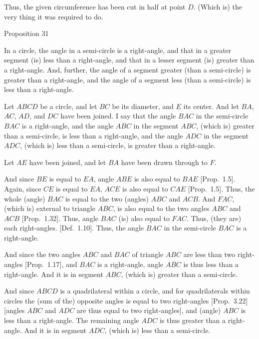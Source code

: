 Thus, the given circumference has been cut in half at point $D$. (Which is)
the very thing it was required to do. 


\begin{center}
{\large Proposition 31}
\end{center}

In a circle, the angle in a semi-circle is a right-angle, and that in a
greater segment (is) less than a right-angle, and that in a
lesser segment (is) greater than a right-angle. And, further, the angle of
a segment greater (than a semi-circle) is greater than a right-angle, and
the angle of a segment less (than a semi-circle) is less than a right-angle.

\epsfysize=2.2in
\centerline{}

Let $ABCD$  be a circle, and let $BC$ be its diameter, and $E$ its center. And let $BA$, $AC$, $AD$, and $DC$ have been joined. I say that the angle $BAC$ in the semi-circle $BAC$ is a right-angle, and the angle $ABC$ in the segment $ABC$, (which is) greater than a semi-circle, is less
than a right-angle, and the angle $ADC$ in the segment $ADC$, (which is) less than a semi-circle,
is greater than a right-angle.

Let $AE$ have been joined, and let $BA$ have been drawn through to $F$.

And since $BE$ is equal to $EA$, angle $ABE$ is also equal to $BAE$ [Prop.~1.5]. Again, since $CE$ is equal to $EA$, $ACE$ is also equal to  $CAE$ [Prop.~1.5].
Thus, the whole (angle) $BAC$ is equal to the two (angles) $ABC$ and $ACB$.
And $FAC$, (which is) external to triangle $ABC$, is also equal to the two angles
$ABC$ and $ACB$ [Prop.~1.32]. Thus, angle $BAC$ (is) also equal to
$FAC$. Thus, (they are) each right-angles. [Def.~1.10]. Thus, the angle
$BAC$ in the semi-circle $BAC$ is a right-angle.

And since the two angles $ABC$ and $BAC$ of triangle $ABC$ are less than 
two right-angles [Prop.~1.17], and $BAC$ is a right-angle, angle $ABC$ is
thus less than a right-angle. And it is in segment $ABC$, (which is) greater 
than
a semi-circle.

And since $ABCD$ is a quadrilateral within a circle, and for quadrilaterals within circles
the (sum of the) opposite angles is equal to two right-angles 
[Prop.~3.22] [angles $ABC$ and $ADC$ are thus equal to two right-angles],
and (angle) $ABC$ is  less than a right-angle. The remaining angle $ADC$
is thus greater than a right-angle. And it is in segment $ADC$, (which is)
less than a semi-circle.


